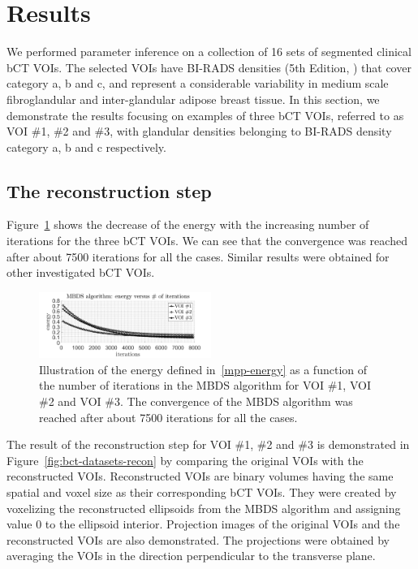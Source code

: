 \documentclass[journal]{IEEEtran}
\begin{document}
\section{Results}
\label{sec:results}

We performed parameter inference on a collection of 16 sets of
segmented clinical bCT VOIs. The selected VOIs have BI-RADS densities
(5th Edition, \cite{d2013acr}) that cover category a, b and c, and
represent a considerable variability in medium scale fibroglandular
and inter-glandular adipose breast tissue. In this section, we
demonstrate the results focusing on examples of three bCT VOIs,
referred to as VOI \#1, \#2 and \#3, with glandular densities
belonging to BI-RADS density category a, b and c respectively.

\subsection{The reconstruction step}
\label{sec:reconstruction-step}

Figure~\ref{fig:conv-mbds} shows the decrease of the energy with the
increasing number of iterations for the three bCT VOIs. We can see
that the convergence was reached after about 7500 iterations for all
the cases. Similar results were obtained for other investigated bCT
VOIs.

\begin{figure}[!htb]
  \centering
  \includegraphics[width=0.5\textwidth]
  {figure/convergence_mbds}
  \caption{Illustration of the energy defined in~\eqref{mpp-energy} as
    a function of the number of iterations in the MBDS algorithm for
    VOI \#1, VOI \#2 and VOI \#3. The convergence of the MBDS
    algorithm was reached after about 7500 iterations for all the
    cases.}
  \label{fig:conv-mbds}
\end{figure}

The result of the reconstruction step for VOI \#1, \#2 and \#3 is
demonstrated in Figure~\ref{fig:bct-datasets-recon} by comparing the
original VOIs with the reconstructed VOIs. Reconstructed VOIs are
binary volumes having the same spatial and voxel size as their
corresponding bCT VOIs. They were created by voxelizing the
reconstructed ellipsoids from the MBDS algorithm and assigning value 0
to the ellipsoid interior. Projection images of the original VOIs and
the reconstructed VOIs are also demonstrated. The projections were
obtained by averaging the VOIs in the direction perpendicular to the
transverse plane.
\end{document}
